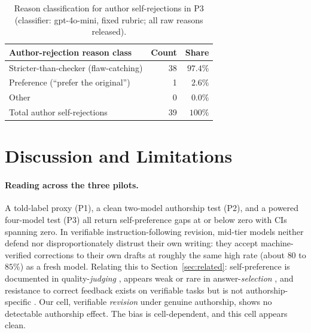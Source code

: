 \documentclass[11pt]{article}
\begin{document}
\begin{table}[t]
\centering
\small
\begin{tabular}{lrr}
\toprule
Author-rejection reason class & Count & Share \\
\midrule
Stricter-than-checker (flaw-catching) & 38 & $97.4\%$ \\
Preference (``prefer the original'')  & 1  & $2.6\%$ \\
Other                                  & 0  & $0.0\%$ \\
\midrule
Total author self-rejections           & 39 & $100\%$ \\
\bottomrule
\end{tabular}
\caption{Reason classification for author self-rejections in P3 (classifier: gpt-4o-mini, fixed
rubric; all raw reasons released).}
\label{tab:reasons}
\end{table}

\section{Discussion and Limitations}
\label{sec:disc}

\paragraph{Reading across the three pilots.} A told-label proxy (P1), a clean two-model
authorship test (P2), and a powered four-model test (P3) all return self-preference gaps at or
below zero with CIs spanning zero. In verifiable instruction-following revision, mid-tier models
neither defend nor disproportionately distrust their own writing: they accept machine-verified
corrections to their own drafts at roughly the same high rate (about $80$ to $85\%$) as a fresh
model. Relating this to Section~\ref{sec:related}: self-preference is documented in
quality-\emph{judging} \citep{panickssery2024llm,xu2024pride}, appears weak or rare in
answer-\emph{selection} \citep{choi2026identity}, and resistance to correct feedback exists on
verifiable tasks but is not authorship-specific \citep{jiang2025feedback}. Our cell, verifiable
\emph{revision} under genuine authorship, shows no detectable authorship effect. The bias is
cell-dependent, and this cell appears clean.
\end{document}
